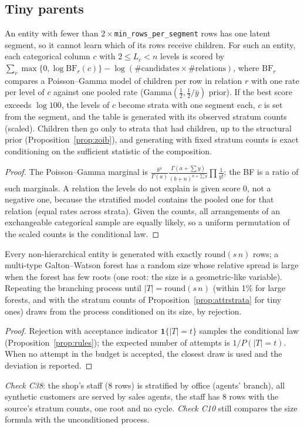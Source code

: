\subsection{Tiny parents}
\begin{proposition}\label{prop:attrstrata}
An entity with fewer than $2\times$\texttt{min\_rows\_per\_segment} rows has one latent segment, so it cannot learn which of its rows receive children. For such an entity, each categorical column $c$ with $2\le L_c<n$ levels is scored by $\sum_r\max\{0,\log\mathrm{BF}_r(c)\}-\log(\#\text{candidates}\times\#\text{relations})$, where $\mathrm{BF}_r$ compares a Poisson--Gamma model of children per row in relation $r$ with one rate per level of $c$ against one pooled rate (Gamma$(\tfrac12,\tfrac12/\bar y)$ prior). If the best score exceeds $\log100$, the levels of $c$ become strata with one segment each, $c$ is set from the segment, and the table is generated with its observed stratum counts (scaled). Children then go only to strata that had children, up to the structural prior (Proposition~\ref{prop:zoib}), and generating with fixed stratum counts is exact conditioning on the sufficient statistic of the composition.
\end{proposition}
\begin{proof}
The Poisson--Gamma marginal is $\frac{b^a}{\Gamma(a)}\frac{\Gamma(a+\sum y)}{(b+n)^{a+\sum y}}\prod\frac1{y!}$; the BF is a ratio of such marginals. A relation the levels do not explain is given score 0, not a negative one, because the stratified model contains the pooled one for that relation (equal rates across strata). Given the counts, all arrangements of an exchangeable categorical sample are equally likely, so a uniform permutation of the scaled counts is the conditional law.
\end{proof}

\begin{proposition}\label{prop:treesize}
Every non-hierarchical entity is generated with exactly $\mathrm{round}(s\,n)$ rows; a multi-type Galton--Watson forest has a random size whose relative spread is large when the forest has few roots (one root: the size is a geometric-like variable). Repeating the branching process until $|T|=\mathrm{round}(s\,n)$ (within 1\% for large forests, and with the stratum counts of Proposition~\ref{prop:attrstrata} for tiny ones) draws from the process conditioned on its size, by rejection.
\end{proposition}
\begin{proof}
Rejection with acceptance indicator $\mathbf 1\{|T|=t\}$ samples the conditional law (Proposition~\ref{prop:rules}); the expected number of attempts is $1/P(|T|=t)$. When no attempt in the budget is accepted, the closest draw is used and the deviation is reported.
\end{proof}
\noindent\emph{Check C38}: the shop's staff (8 rows) is stratified by office (agents' branch), all synthetic customers are served by sales agents, the staff has 8 rows with the source's stratum counts, one root and no cycle. \emph{Check C10} still compares the size formula with the unconditioned process.

